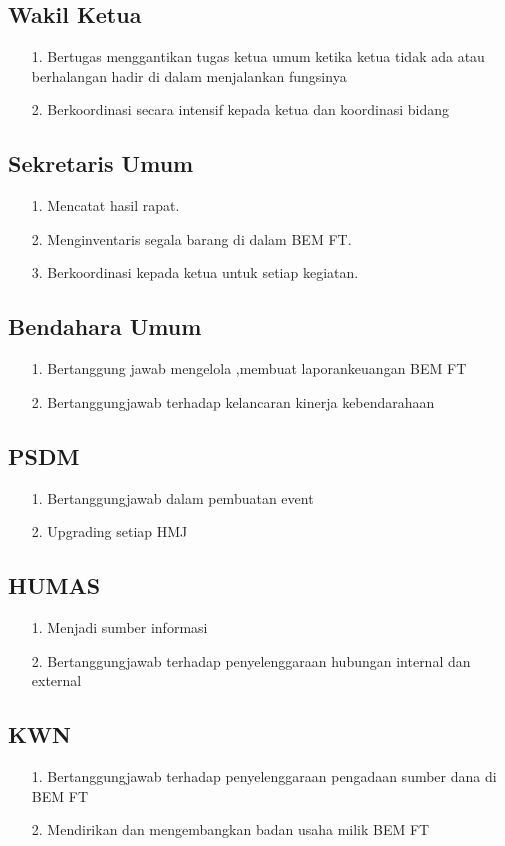\documentclass{jtetiproposalskripsi}
\begin{document}
\subsection{Wakil Ketua}
\begin{itemize}
\item[1.] Bertugas menggantikan tugas ketua umum ketika ketua tidak ada atau berhalangan hadir di dalam menjalankan fungsinya
\item[2.] Berkoordinasi secara intensif kepada ketua dan koordinasi bidang
\end{itemize}
\subsection{Sekretaris Umum}
\begin{itemize}
\item[1.] Mencatat hasil rapat.
\item[2.] Menginventaris segala barang di dalam BEM FT.
\item[3.] Berkoordinasi kepada ketua untuk setiap kegiatan.
\end{itemize}
\subsection{Bendahara Umum}
\begin{itemize}
\item[1.] Bertanggung jawab mengelola ,membuat laporankeuangan BEM FT
\item[2.] Bertanggungjawab terhadap kelancaran kinerja kebendarahaan
\end{itemize}
\subsection{PSDM}
\begin{itemize}
\item[1.] Bertanggungjawab dalam pembuatan event
\item[2.] Upgrading setiap HMJ
\end{itemize}
\subsection{HUMAS}
\begin{itemize}
\item[1.] Menjadi sumber informasi
\item[2.] Bertanggungjawab terhadap penyelenggaraan hubungan internal dan external
\end{itemize}
\subsection{KWN}
\begin{itemize}
\item[1.] Bertanggungjawab terhadap penyelenggaraan pengadaan sumber dana di BEM FT
\item[2.] Mendirikan dan mengembangkan badan usaha milik BEM FT
\end{itemize}
\end{document}
